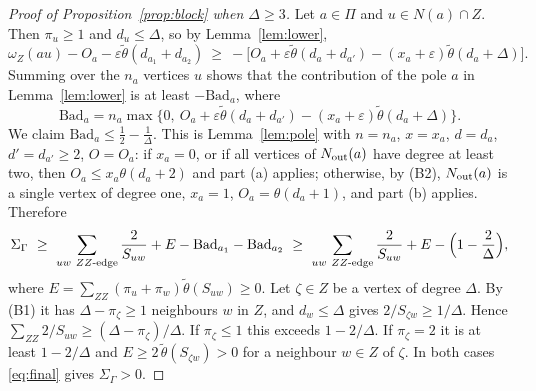 \documentclass[11pt]{article}
\theoremstyle{definition}
\theoremstyle{remark}
\newcommand{\tht}{\theta}
\newcommand{\tth}{\tilde\theta}
\newcommand{\Bad}{\mathrm{Bad}}
\begin{document}
\begin{proof}[Proof of Proposition~\ref{prop:block} when $\Delta\ge3$]
Let $a\in\Pi$ and $u\in N(a)\cap Z$. Then $\pi_u\ge1$ and $d_u\le\Delta$, so by
Lemma~\ref{lem:lower},
\[
 \omega_Z(au)-O_a-\varepsilon\tth(d_{a_1}+d_{a_2})
 \ \ge\ -\bigl[O_a+\varepsilon\tth(d_a+d_{a'})-(x_a+\varepsilon)\tth(d_a+\Delta)\bigr].
\]
Summing over the $n_a$ vertices $u$ shows that the contribution of the pole $a$ in
Lemma~\ref{lem:lower} is at least $-\Bad_a$, where
\[
 \Bad_a=n_a\max\bigl\{0,\ O_a+\varepsilon\tth(d_a+d_{a'})-(x_a+\varepsilon)\tth(d_a+\Delta)\bigr\}.
\]
We claim $\Bad_a\le\frac12-\frac1\Delta$. This is Lemma~\ref{lem:pole} with $n=n_a$, $x=x_a$,
$d=d_a$, $d'=d_{a'}\ge2$, $O=O_a$: if $x_a=0$, or if all vertices of $N_{\rm out}(a)$ have
degree at least two, then $O_a\le x_a\tht(d_a+2)$ and part (a) applies; otherwise, by (B2),
$N_{\rm out}(a)$ is a single vertex of degree one, $x_a=1$, $O_a=\tht(d_a+1)$, and part (b)
applies. Therefore
\begin{equation}\label{eq:final}
 \Sigma_\Gamma\ \ge\ \sum_{uw\ ZZ\text{-edge}}\frac2{S_{uw}}+E-\Bad_{a_1}-\Bad_{a_2}
 \ \ge\ \sum_{uw\ ZZ\text{-edge}}\frac2{S_{uw}}+E-\Bigl(1-\frac2\Delta\Bigr),
\end{equation}
where $E=\sum_{ZZ}(\pi_u+\pi_w)\tth(S_{uw})\ge0$. Let $\zeta\in Z$ be a vertex of degree
$\Delta$. By (B1) it has $\Delta-\pi_\zeta\ge1$ neighbours $w$ in $Z$, and $d_w\le\Delta$ gives
$2/S_{\zeta w}\ge1/\Delta$. Hence $\sum_{ZZ}2/S_{uw}\ge(\Delta-\pi_\zeta)/\Delta$. If
$\pi_\zeta\le1$ this exceeds $1-2/\Delta$. If $\pi_\zeta=2$ it is at least $1-2/\Delta$ and
$E\ge2\,\tth(S_{\zeta w})>0$ for a neighbour $w\in Z$ of $\zeta$. In both cases
\eqref{eq:final} gives $\Sigma_\Gamma>0$.
\end{proof}
\end{document}

